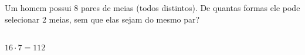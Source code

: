\begin{ex}
 	Um homem possui 8 pares de meias (todos distintos). De quantas formas ele pode selecionar 2 meias, sem que elas sejam do mesmo par?
 	  \begin{sol}
 	   \phantom{A}  \\
 	   $16\cdot7=112$
 	  \end{sol}
\end{ex}